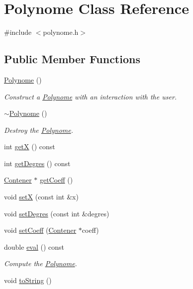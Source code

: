 \hypertarget{class_polynome}{\section{\-Polynome \-Class \-Reference}
\label{class_polynome}
}


{\ttfamily \#include $<$polynome.\-h$>$}

\subsection*{\-Public \-Member \-Functions}
\begin{DoxyCompactItemize}
\item 
\hypertarget{class_polynome_a48fbfd3cd58c7a6ca4d0dd10d31bf06a}{\hyperlink{class_polynome_a48fbfd3cd58c7a6ca4d0dd10d31bf06a}{\-Polynome} ()}\label{class_polynome_a48fbfd3cd58c7a6ca4d0dd10d31bf06a}

\begin{DoxyCompactList}\small\item\em \-Construct a \hyperlink{class_polynome}{\-Polynome} with an interaction with the user. \end{DoxyCompactList}\item 
\hypertarget{class_polynome_a3f3d7da165b91d8cff44dad28ce58fa2}{\hyperlink{class_polynome_a3f3d7da165b91d8cff44dad28ce58fa2}{$\sim$\-Polynome} ()}\label{class_polynome_a3f3d7da165b91d8cff44dad28ce58fa2}

\begin{DoxyCompactList}\small\item\em \-Destroy the \hyperlink{class_polynome}{\-Polynome}. \end{DoxyCompactList}\item 
int \hyperlink{class_polynome_a7aa26c3848398b54060f9a56f0a71115}{get\-X} () const 
\item 
int \hyperlink{class_polynome_ae38c5a8d6c1e5d042616e85a53089cea}{get\-Degres} () const 
\item 
\hyperlink{class_contener}{\-Contener} $\ast$ \hyperlink{class_polynome_a097ba5df9216e260c0b18040e605db40}{get\-Coeff} ()
\item 
void \hyperlink{class_polynome_aa4d6009437e84a04987cce5297afd8d1}{set\-X} (const int \&x)
\item 
void \hyperlink{class_polynome_ad20d1d98c1d1da1e264ee56c1a72050c}{set\-Degres} (const int \&degres)
\item 
void \hyperlink{class_polynome_aee44ceb152665f808576e535eddd8267}{set\-Coeff} (\hyperlink{class_contener}{\-Contener} $\ast$coeff)
\item 
double \hyperlink{class_polynome_aef974533b88294be9b8978709a60908c}{eval} () const 
\begin{DoxyCompactList}\small\item\em \-Compute the \hyperlink{class_polynome}{\-Polynome}. \end{DoxyCompactList}\item 
\hypertarget{class_polynome_a07fb8401f8d3774957cc23a364280528}{void \hyperlink{class_polynome_a07fb8401f8d3774957cc23a364280528}{to\-String} ()}\label{class_polynome_a07fb8401f8d3774957cc23a364280528}


\end{DoxyCompactItemize}
